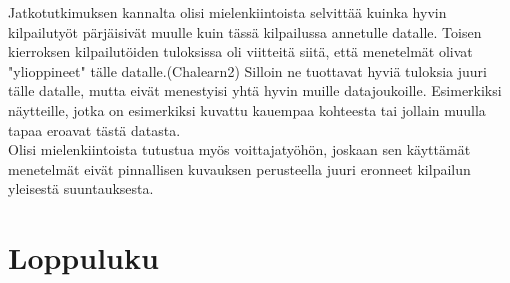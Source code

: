 Jatkotutkimuksen kannalta olisi mielenkiintoista selvittää kuinka hyvin kilpailutyöt pärjäisivät
muulle kuin tässä kilpailussa annetulle datalle. Toisen kierroksen kilpailutöiden tuloksissa oli viitteitä
siitä, että menetelmät olivat "ylioppineet" tälle datalle.(Chalearn2) Silloin ne tuottavat hyviä tuloksia juuri
tälle datalle, mutta eivät menestyisi yhtä hyvin muille datajoukoille. Esimerkiksi näytteille, jotka on esimerkiksi kuvattu kauempaa 
kohteesta tai jollain muulla tapaa eroavat tästä datasta. \\

Olisi mielenkiintoista tutustua myös voittajatyöhön, joskaan sen käyttämät menetelmät eivät pinnallisen
kuvauksen perusteella juuri eronneet kilpailun yleisestä suuntauksesta.





































\section{Loppuluku}




